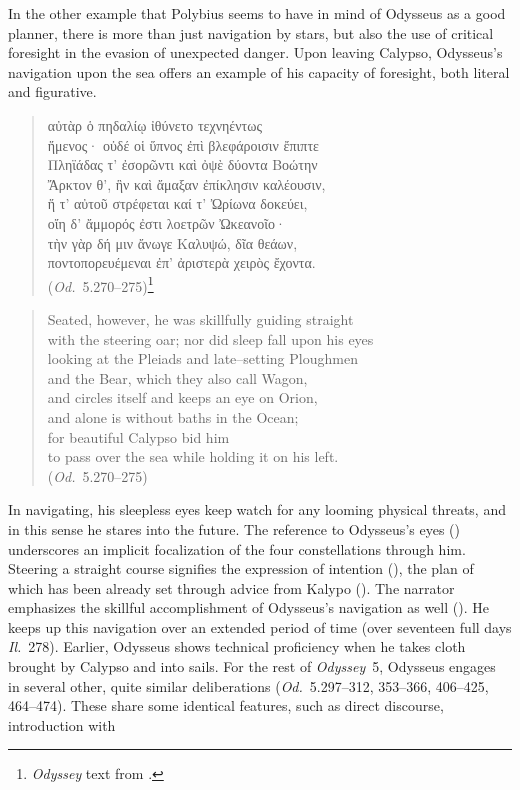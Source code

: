 \documentclass[12pt,letterpaper,oneside,final]{memoir}
\begin{document}
In the other example that Polybius seems to have in mind of Odysseus as a good planner, there is more than just navigation by stars, but also the use of critical foresight in the evasion of unexpected danger. Upon leaving Calypso, Odysseus's navigation upon the sea offers an example of his capacity of foresight, both literal and figurative. \begin{verse}\SingleSpacing \textgreek{αὐτὰρ ὁ πηδαλίῳ ἰθύνετο τεχνηέντως \\ ἥμενος· οὐδέ οἱ ὕπνος ἐπὶ βλεφάροισιν ἔπιπτε \\ Πληϊάδας τ' ἐσορῶντι καὶ ὀψὲ δύοντα Βοώτην \\ Ἄρκτον θ', ἣν καὶ ἄμαξαν ἐπίκλησιν καλέουσιν, \\ ἥ τ' αὐτοῦ στρέφεται καί τ' Ὠρίωνα δοκεύει, \\ οἴη δ' ἄμμορός ἐστι λοετρῶν Ὠκεανοῖο· \\ τὴν γὰρ δή μιν ἄνωγε Καλυψώ, δῖα θεάων, \\ ποντοπορευέμεναι ἐπ' ἀριστερὰ χειρὸς ἔχοντα.} \\ (\emph{Od.}~5.270--275)\footnote{\emph{Odyssey} text from \textcite{muhll1962}.}\end{verse} \begin{verse} \SingleSpacing Seated, however, he was skillfully guiding straight \\ with the steering oar; nor did sleep fall upon his eyes \\ looking at the Pleiads and late--setting Ploughmen \\ and the Bear, which they also call Wagon, \\ and circles itself and keeps an eye on Orion, \\ and alone is without baths in the Ocean; \\ for beautiful Calypso bid him \\ to pass over the sea while holding it on his left. \\ (\emph{Od.}~5.270--275)\end{verse} \DoubleSpacing In navigating, his sleepless eyes keep watch for any looming physical threats, and in this sense he stares into the future. The reference to Odysseus's eyes () underscores an implicit focalization of the four constellations through him. Steering a straight course signifies the expression of intention (), the plan of which has been already set through advice from Kalypo (). The narrator emphasizes the skillful accomplishment of Odysseus's navigation as well (). He keeps up this navigation over an extended period of time (over seventeen full days \emph{Il.}~278). Earlier, Odysseus shows technical proficiency when he takes cloth brought by Calypso and  into sails. For the rest of \emph{Odyssey}~5, Odysseus engages in several other, quite similar deliberations (\emph{Od.}~5.297--312, 353--366, 406--425, 464--474). These share some identical features, such as direct discourse, introduction with 
\end{document}
